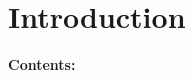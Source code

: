 
\chapter{Introduction} %

\noindent\textbf{\large Contents:}

\noindent\hrulefill
\noindent\startcontents[chapters]
\noindent{}
\noindent\hrulefill

\label{Chapter1} %







